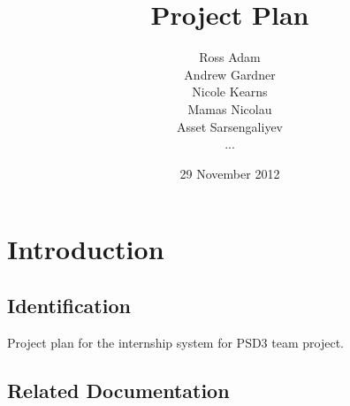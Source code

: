 \documentclass{l3deliverable}
\title{Project Plan}
\author{
  Ross Adam \\
  Andrew Gardner \\
  Nicole Kearns \\
  Mamas Nicolau \\
  Asset Sarsengaliyev \\
  ...}
\date{29 November 2012}
\begin{document}

\maketitle

\tableofcontents

\newpage


\section{Introduction}

\subsection{Identification}

Project plan for the internship system for PSD3 team project.

\subsection{Related Documentation}
\end{document}
